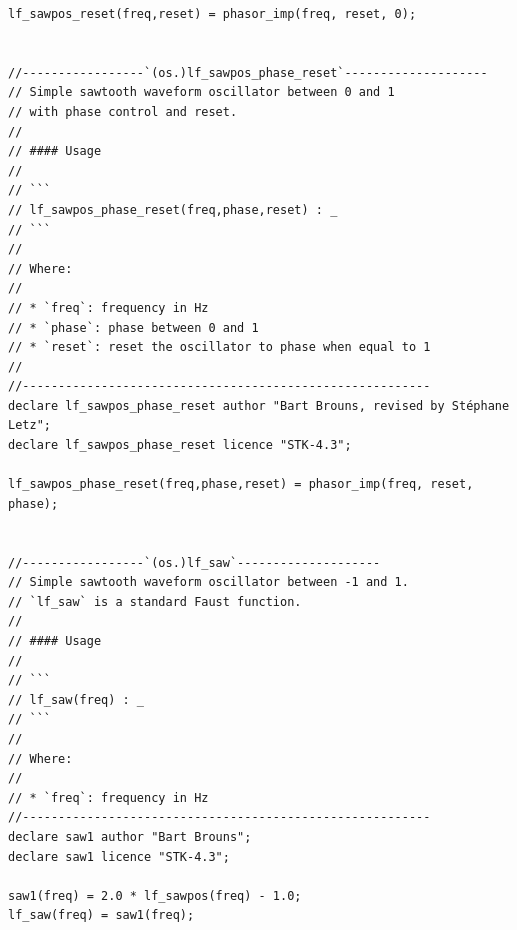 \documentclass{article}
\begin{document}
\begin{lstlisting}[caption=\texttt{oscillators.lib}]
lf_sawpos_reset(freq,reset) = phasor_imp(freq, reset, 0);


//-----------------`(os.)lf_sawpos_phase_reset`--------------------
// Simple sawtooth waveform oscillator between 0 and 1
// with phase control and reset.
//
// #### Usage
//
// ```
// lf_sawpos_phase_reset(freq,phase,reset) : _
// ```
//
// Where:
//
// * `freq`: frequency in Hz
// * `phase`: phase between 0 and 1
// * `reset`: reset the oscillator to phase when equal to 1
//
//---------------------------------------------------------
declare lf_sawpos_phase_reset author "Bart Brouns, revised by Stéphane Letz";
declare lf_sawpos_phase_reset licence "STK-4.3";

lf_sawpos_phase_reset(freq,phase,reset) = phasor_imp(freq, reset, phase);


//-----------------`(os.)lf_saw`--------------------
// Simple sawtooth waveform oscillator between -1 and 1.
// `lf_saw` is a standard Faust function.
//
// #### Usage
//
// ```
// lf_saw(freq) : _
// ```
//
// Where:
//
// * `freq`: frequency in Hz
//---------------------------------------------------------
declare saw1 author "Bart Brouns";
declare saw1 licence "STK-4.3";

saw1(freq) = 2.0 * lf_sawpos(freq) - 1.0;
lf_saw(freq) = saw1(freq);


\end{lstlisting}
\end{document}
